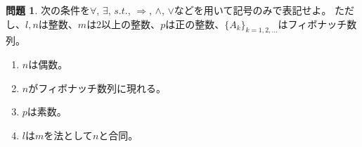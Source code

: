 \documentclass[uplatex]{jsarticle}
\theoremstyle{definition}
\numberwithin{equation}{section}
\newtheorem{prob}[section]{問題}
\begin{document}
\begin{prob}
  次の条件を$\forall$, $\exists$, $s.t.$, $\Rightarrow$, $\land$, $\lor$などを用いて記号のみで表記せよ。
  ただし、$l,n$は整数、$m$は2以上の整数、$p$は正の整数、$\{A_k\}_{k=1,2,\dots}$はフィボナッチ数列。
  \begin{enumerate}
    \item $n$は偶数。
    \item $n$がフィボナッチ数列に現れる。
    \item $p$は素数。
    \item $l$は$m$を法として$n$と合同。
  \end{enumerate}
\end{prob}
\end{document}
